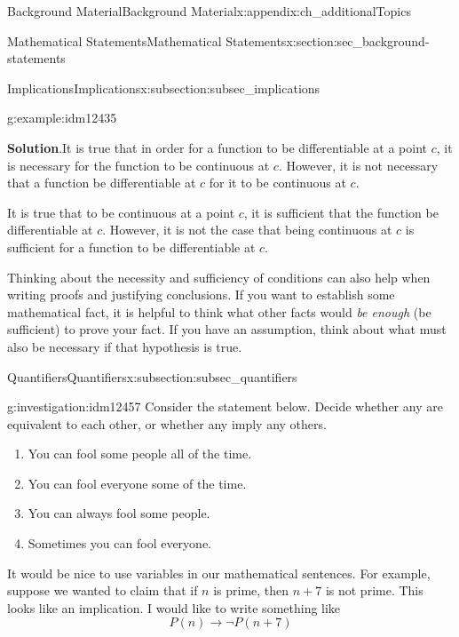 \documentclass[oneside,10pt,]{book}
\numberwithin{equation}{chapter}
\def\imp{\rightarrow}
\begin{document}
\begin{appendixptx}{Background Material}{}{Background Material}{}{}{x:appendix:ch_additionalTopics}
\begin{sectionptx}{Mathematical Statements}{}{Mathematical Statements}{}{}{x:section:sec_background-statements}
\begin{subsectionptx}{Implications}{}{Implications}{}{}{x:subsection:subsec_implications}
\begin{example}{}{g:example:idm12435}
\par\smallskip%
\noindent\textbf{Solution}.\hypertarget{g:solution:idm12442}{}\quad{}It is true that in order for a function to be differentiable at a point \(c\), it is necessary for the function to be continuous at \(c\). However, it is not necessary that a function be differentiable at \(c\) for it to be continuous at \(c\).%
\par
It is true that to be continuous at a point \(c\), it is sufficient that the function be differentiable at \(c\). However, it is not the case that being continuous at \(c\) is sufficient for a function to be differentiable at \(c\).%
\end{example}
Thinking about the necessity and sufficiency of conditions can also help when writing proofs and justifying conclusions. If you want to establish some mathematical fact, it is helpful to think what other facts would \emph{be enough} (be sufficient) to prove your fact. If you have an assumption, think about what must also be necessary if that hypothesis is true.%
\end{subsectionptx}
%
%
\typeout{************************************************}
\typeout{************************************************}
%
\begin{subsectionptx}{Quantifiers}{}{Quantifiers}{}{}{x:subsection:subsec_quantifiers}
\begin{investigation}{}{g:investigation:idm12457}%
Consider the statement below. Decide whether any are equivalent to each other, or whether any imply any others.%
\par
%
\begin{enumerate}
\item{}You can fool some people all of the time.%
\item{}You can fool everyone some of the time.%
\item{}You can always fool some people.%
\item{}Sometimes you can fool everyone.%
\end{enumerate}
%
\end{investigation}
It would be nice to use variables in our mathematical sentences. For example, suppose we wanted to claim that if \(n\) is prime, then \(n+7\) is not prime. This looks like an implication. I would like to write something like%
\begin{equation*}
P(n) \imp \neg P(n+7) 
\end{equation*}

\end{subsectionptx}
\end{sectionptx}
\end{appendixptx}
\end{document}
